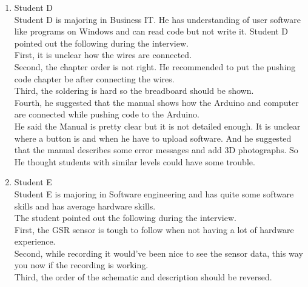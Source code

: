 \documentclass[conference]{IEEEtran}
\begin{document}
\begin{enumerate}
\begin{enumerate}
					\item Student D\\
					Student D is majoring in Business IT. He has understanding of user software like programs on Windows and can read code but not write it. Student D pointed out the following during the interview.\\
					First, it is unclear how the wires are connected.\\
					Second, the chapter order is not right. He recommended to put the pushing code chapter be after connecting the wires.\\
					Third, the soldering is hard so the breadboard should be shown.\\
					Fourth, he suggested that the manual shows how the Arduino and computer are connected while pushing code to the Arduino.\\
					He said the Manual is pretty clear but it is not detailed enough. It is unclear where a button is and when he have to upload software. And he suggested that the manual describes some error messages and add 3D photographs. So He thought students with similar levels could have some trouble. \\
					
					\item Student E\\
					Student E is majoring in Software engineering and has quite some software skills and has average hardware skills.\\
					The student pointed out the following during the interview.\\
					First, the GSR sensor is tough to follow when not having a lot of hardware experience.\\
					Second, while recording it would've been nice to see the sensor data, this way you now if the recording is working.\\
					Third, the order of the schematic and description should be reversed.\\
					

\end{enumerate}
\end{enumerate}
\end{document}
